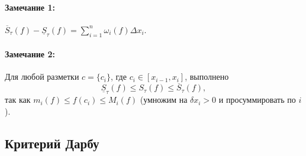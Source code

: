 \documentclass{article}
\theoremstyle{plain}
\theoremstyle{definition}
\theoremstyle{remark}
\begin{document}
\paragraph{Замечание 1:} $\overline{S}_{\tau}(f) - \underline{S}_{\tau}(f) =\sum_{i=1}^n \omega_i(f)\Delta x_i$. 

\paragraph{Замечание 2:} Для любой разметки $c=\{c_i\}$, где $c_i\in[x_{i-1}, x_i]$, выполнено 
$$\underline{S}_{\tau}(f) \leq S_{\tau}(f) \leq \overline{S}_{\tau}(f),$$
так как $m_i(f) \leq f(c_i) \leq M_i(f)$ (умножим на $\delta x_i > 0$ и просуммировать по $i$).

\subsection{Критерий Дарбу}
\end{document}
